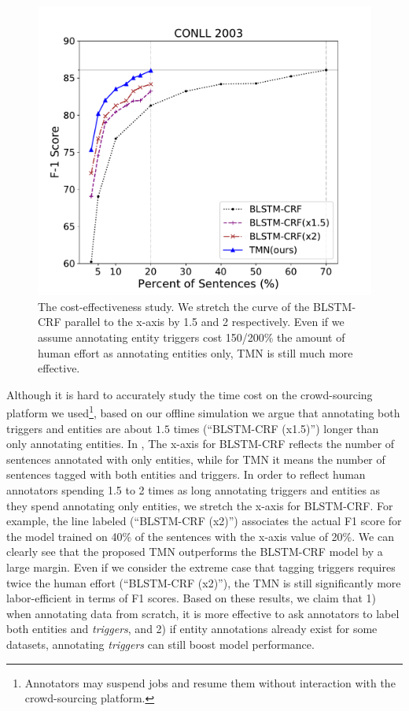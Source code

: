 \begin{figure}[h]
\centering
	\includegraphics[width=0.8\linewidth]{LatexDiss/figures/singlelabelefficiency.pdf}
	\caption{ The cost-effectiveness study. We stretch the curve of the BLSTM-CRF parallel to the x-axis by 1.5 and 2 respectively. Even if we assume annotating  entity triggers cost 150/200\% the amount of human effort as annotating entities only, TMN is still much more effective. }
	\label{fig:curve}
\end{figure}

Although it is hard to accurately study the time cost on the crowd-sourcing platform we used\footnote{Annotators may suspend jobs and resume them without interaction with the crowd-sourcing platform.}, based on our offline simulation we argue that annotating both triggers and entities are about $1.5$ times (``BLSTM-CRF (x1.5)'') longer than only annotating entities.
In , The x-axis for BLSTM-CRF reflects the number of sentences annotated with only entities, while for TMN it means the number of sentences tagged with both entities and triggers. 
In order to reflect human annotators spending 1.5 to 2 times as long annotating triggers and entities as they spend annotating only entities, we stretch the x-axis for BLSTM-CRF. For example, the line labeled (``BLSTM-CRF (x2)'') associates the actual F1 score for the model trained on 40\% of the sentences with the x-axis value of 20\%. 
We can clearly see that the proposed TMN outperforms the BLSTM-CRF model by a large margin. 
Even if we consider the extreme case that tagging triggers requires twice the human effort (``BLSTM-CRF (x2)''), the TMN is still significantly more labor-efficient in terms of F1 scores. Based on these results, we claim that 1) when annotating data from scratch, it is more effective to ask annotators to label both entities and \textit{triggers}, and 2) if entity annotations already exist for some datasets, annotating \textit{triggers} can still boost model performance.


